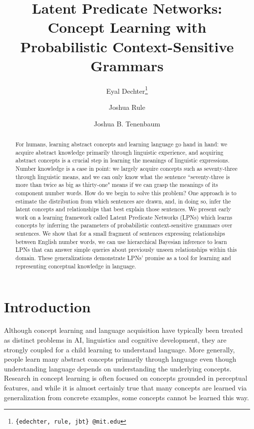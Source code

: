 \documentclass{article} %
\title{Latent Predicate Networks: Concept Learning with Probabilistic Context-Sensitive Grammars}
\author{Eyal Dechter\thanks{{\tt \{edechter, rule, jbt\} @mit.edu}}}
\author{Joshua Rule}
\author{Joshua B. Tenenbaum}
\affil{Department of Brain and Cognitive Sciences, MIT}
\begin{document}
\maketitle

\begin{abstract}
  For humans, learning abstract concepts and learning language go hand
  in hand: we acquire abstract knowledge primarily through linguistic
  experience, and acquiring abstract concepts is a crucial step in
  learning the meanings of linguistic expressions. Number knowledge is
  a case in point: we largely acquire concepts such as seventy-three
  through linguistic means, and we can only know what the sentence
  ``seventy-three is more than twice as big as thirty-one" means if we
  can grasp the meanings of its component number words. How do we
  begin to solve this problem? One approach is to estimate the
  distribution from which sentences are drawn, and, in doing so, infer
  the latent concepts and relationships that best explain those
  sentences. We present early work on a learning framework called
  Latent Predicate Networks (LPNs) which learns concepts by inferring
  the parameters of probabilistic context-sensitive grammars over
  sentences.  We show that for a small fragment of sentences
  expressing relationships between English number words, we can use
  hierarchical Bayesian inference to learn LPNs that can answer simple
  queries about previously unseen relationships within this
  domain. These generalizations demonstrate LPNs' promise as a tool
  for learning and representing conceptual knowledge in language.
\end{abstract}

\section{Introduction}

Although concept learning and language acquisition have typically been
treated as distinct problems in AI, linguistics and cognitive
development, they are strongly coupled for a child learning to
understand language. More generally, people learn many abstract
concepts primarily through language even though understanding language
depends on understanding the underlying concepts. Research in concept
learning is often focused on concepts grounded in perceptual features,
and while it is almost certainly true that many concepts are learned
via generalization from concrete examples, some concepts cannot be
learned this way.
\end{document}
